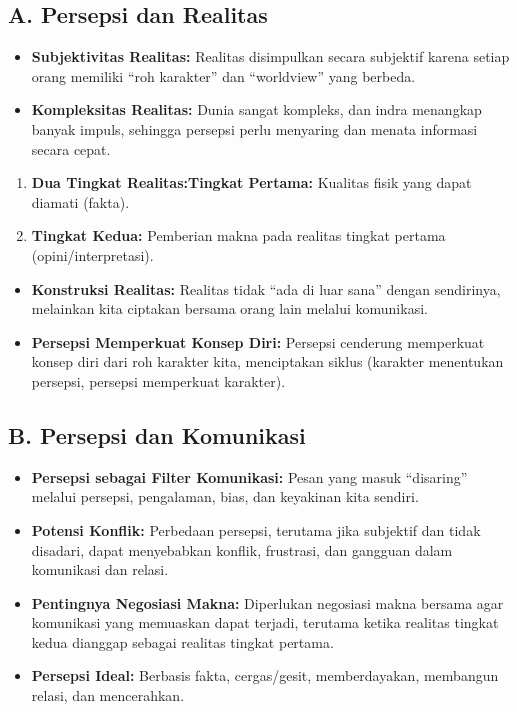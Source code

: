 \documentclass[
  letterpaper,
  DIV=11,
  numbers=noendperiod]{scrreprt}
\providecommand{\tightlist}{%
  \setlength{\itemsep}{0pt}\setlength{\parskip}{0pt}}
\begin{document}
\subsection{A. Persepsi dan Realitas}\label{a.-persepsi-dan-realitas}

\begin{itemize}
\tightlist
\item
  \textbf{Subjektivitas Realitas:} Realitas disimpulkan secara subjektif
  karena setiap orang memiliki ``roh karakter'' dan ``worldview'' yang
  berbeda.
\item
  \textbf{Kompleksitas Realitas:} Dunia sangat kompleks, dan indra
  menangkap banyak impuls, sehingga persepsi perlu menyaring dan menata
  informasi secara cepat.
\end{itemize}

\begin{enumerate}
\def\labelenumi{\arabic{enumi}.}
\tightlist
\item
  \textbf{Dua Tingkat Realitas:Tingkat Pertama:} Kualitas fisik yang
  dapat diamati (fakta).
\item
  \textbf{Tingkat Kedua:} Pemberian makna pada realitas tingkat pertama
  (opini/interpretasi).
\end{enumerate}

\begin{itemize}
\tightlist
\item
  \textbf{Konstruksi Realitas:} Realitas tidak ``ada di luar sana''
  dengan sendirinya, melainkan kita ciptakan bersama orang lain melalui
  komunikasi.
\item
  \textbf{Persepsi Memperkuat Konsep Diri:} Persepsi cenderung
  memperkuat konsep diri dari roh karakter kita, menciptakan siklus
  (karakter menentukan persepsi, persepsi memperkuat karakter).
\end{itemize}

\subsection{B. Persepsi dan
Komunikasi}\label{b.-persepsi-dan-komunikasi}

\begin{itemize}
\tightlist
\item
  \textbf{Persepsi sebagai Filter Komunikasi:} Pesan yang masuk
  ``disaring'' melalui persepsi, pengalaman, bias, dan keyakinan kita
  sendiri.
\item
  \textbf{Potensi Konflik:} Perbedaan persepsi, terutama jika subjektif
  dan tidak disadari, dapat menyebabkan konflik, frustrasi, dan gangguan
  dalam komunikasi dan relasi.
\item
  \textbf{Pentingnya Negosiasi Makna:} Diperlukan negosiasi makna
  bersama agar komunikasi yang memuaskan dapat terjadi, terutama ketika
  realitas tingkat kedua dianggap sebagai realitas tingkat pertama.
\item
  \textbf{Persepsi Ideal:} Berbasis fakta, cergas/gesit, memberdayakan,
  membangun relasi, dan mencerahkan.
\end{itemize}
\end{document}
